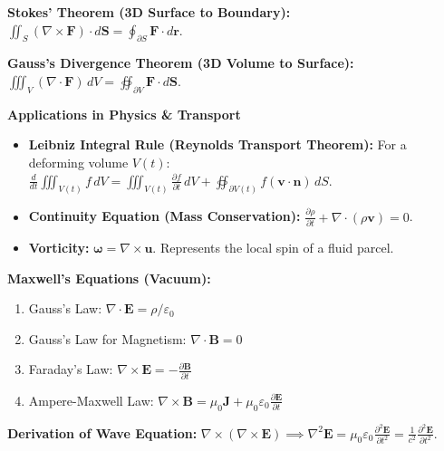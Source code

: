 \documentclass[10pt, landscape, twocolumn]{article}
\newcommand{\cheatsheetsubsection}[1]{
    \vspace{0.5em}
    {\color{themeblue}\normalsize\bfseries #1} \par
    \vspace{0.2em}
}
\begin{document}
\textbf{Stokes' Theorem (3D Surface to Boundary):} 
$\iint_S (\nabla \times \mathbf{F}) \cdot d\mathbf{S} = \oint_{\partial S} \mathbf{F} \cdot d\mathbf{r}$.
\begin{center}
\end{center}

\textbf{Gauss's Divergence Theorem (3D Volume to Surface):} \\
$\iiint_V (\nabla \cdot \mathbf{F}) \, dV = \oiint_{\partial V} \mathbf{F} \cdot d\mathbf{S}$.

\cheatsheetsubsection{Applications in Physics \& Transport}
\begin{itemize}[leftmargin=*, nosep]
    \item \textbf{Leibniz Integral Rule (Reynolds Transport Theorem):} For a deforming volume $V(t)$: \\
    $\frac{d}{dt} \iiint_{V(t)} f \, dV = \iiint_{V(t)} \frac{\partial f}{\partial t} \, dV + \oiint_{\partial V(t)} f(\mathbf{v} \cdot \mathbf{n}) \, dS$.
    \item \textbf{Continuity Equation (Mass Conservation):} $\frac{\partial \rho}{\partial t} + \nabla \cdot (\rho \mathbf{v}) = 0$.
    \item \textbf{Vorticity:} $\boldsymbol{\omega} = \nabla \times \mathbf{u}$. Represents the local spin of a fluid parcel.
\end{itemize}

\textbf{Maxwell's Equations (Vacuum):}
\begin{enumerate}[label=\arabic*., leftmargin=*, nosep]
    \item Gauss's Law: $\nabla \cdot \mathbf{E} = \rho / \varepsilon_0$
    \item Gauss's Law for Magnetism: $\nabla \cdot \mathbf{B} = 0$
    \item Faraday's Law: $\nabla \times \mathbf{E} = -\frac{\partial \mathbf{B}}{\partial t}$
    \item Ampere-Maxwell Law: $\nabla \times \mathbf{B} = \mu_0 \mathbf{J} + \mu_0 \varepsilon_0 \frac{\partial \mathbf{E}}{\partial t}$
\end{enumerate}
\textbf{Derivation of Wave Equation:} $\nabla \times (\nabla \times \mathbf{E}) \implies \nabla^2 \mathbf{E} = \mu_0 \varepsilon_0 \frac{\partial^2 \mathbf{E}}{\partial t^2} = \frac{1}{c^2} \frac{\partial^2 \mathbf{E}}{\partial t^2}$.
\end{document}

